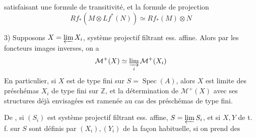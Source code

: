 satisfaisant une formule de transitivité,
et la formule de projection
\[
 Rf_*(M\otimes Lf^*(N))\simeq Rf_*(M)\otimes N
\]

3) Supposons $X=\varprojlim X_i$, système projectif
filtrant ess. affine. Alors par les foncteurs
images inverses, on a
\[
 \mathcal{M}^+(X)\simeq\varinjlim_i \mathcal{M}^+(X_i)
\]
En particulier, si $X$ est de type fini
sur $S=\operatorname{Spec}(A)$, alors $X$ est limite des
préschémas $X_i$ de type fini sur $\mathbb{Z}$, et
la détermination de $\mathcal{M}^+(X)$ avec ses
structures déjà envisagées est  ramenée
au cas des préschémas de type fini.

De , si $(S_i)$ est système
projectif filtrant ess. affine, $S=\varprojlim S_i$,
et si $X,Y$ de t. f. sur $S$ sont
définis par $(X_i),(Y_i)$ de la
façon habituelle, si on prend des

